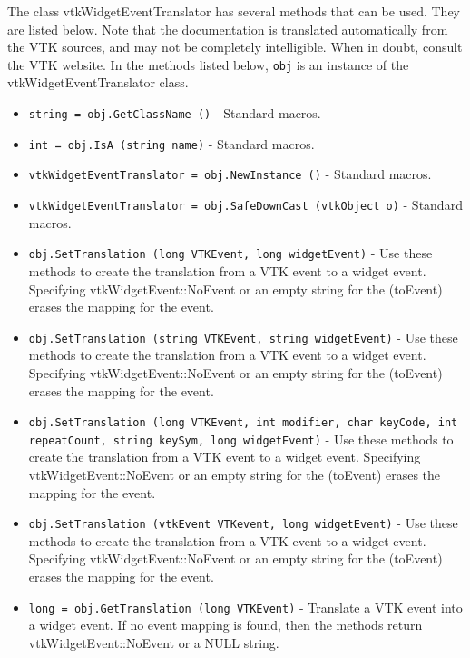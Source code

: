 The class vtkWidgetEventTranslator has several methods that can be used.
  They are listed below.
Note that the documentation is translated automatically from the VTK sources,
and may not be completely intelligible.  When in doubt, consult the VTK website.
In the methods listed below, \verb|obj| is an instance of the vtkWidgetEventTranslator class.
\begin{itemize}
\item  \verb|string = obj.GetClassName ()| -  Standard macros.

\item  \verb|int = obj.IsA (string name)| -  Standard macros.

\item  \verb|vtkWidgetEventTranslator = obj.NewInstance ()| -  Standard macros.

\item  \verb|vtkWidgetEventTranslator = obj.SafeDownCast (vtkObject o)| -  Standard macros.

\item  \verb|obj.SetTranslation (long VTKEvent, long widgetEvent)| -  Use these methods to create the translation from a VTK event to a widget
 event. Specifying vtkWidgetEvent::NoEvent or an empty
 string for the (toEvent) erases the mapping for the event.

\item  \verb|obj.SetTranslation (string VTKEvent, string widgetEvent)| -  Use these methods to create the translation from a VTK event to a widget
 event. Specifying vtkWidgetEvent::NoEvent or an empty
 string for the (toEvent) erases the mapping for the event.

\item  \verb|obj.SetTranslation (long VTKEvent, int modifier, char keyCode, int repeatCount, string keySym, long widgetEvent)| -  Use these methods to create the translation from a VTK event to a widget
 event. Specifying vtkWidgetEvent::NoEvent or an empty
 string for the (toEvent) erases the mapping for the event.

\item  \verb|obj.SetTranslation (vtkEvent VTKevent, long widgetEvent)| -  Use these methods to create the translation from a VTK event to a widget
 event. Specifying vtkWidgetEvent::NoEvent or an empty
 string for the (toEvent) erases the mapping for the event.

\item  \verb|long = obj.GetTranslation (long VTKEvent)| -  Translate a VTK event into a widget event. If no event mapping is found,
 then the methods return vtkWidgetEvent::NoEvent or a NULL string.


\end{itemize}
